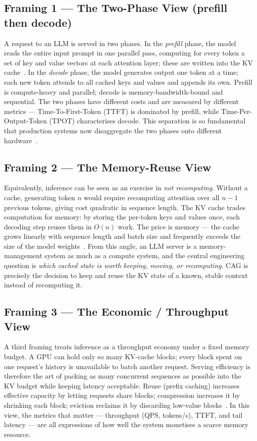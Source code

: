 \documentclass[12pt,a4paper]{article}
\let\cite\citep
\begin{document}
\subsection{Framing 1 --- The Two-Phase View (prefill then decode)}

A request to an LLM is served in two phases. In the \emph{prefill} phase, the
model reads the entire input prompt in one parallel pass, computing for every
token a set of key and value vectors at each attention layer; these are written
into the KV cache~\cite{vaswani2017attention, kwon2023efficient}. In the
\emph{decode} phase, the model generates output one token at a time; each new
token attends to all cached keys and values and appends its own. Prefill is
compute-heavy and parallel; decode is memory-bandwidth-bound and sequential. The
two phases have different costs and are measured by different metrics ---
Time-To-First-Token (TTFT) is dominated by prefill, while Time-Per-Output-Token
(TPOT) characterises decode. This separation is so fundamental that production
systems now disaggregate the two phases onto different
hardware~\cite{zhong2024distserve}.

\subsection{Framing 2 --- The Memory-Reuse View}

Equivalently, inference can be seen as an exercise in \emph{not recomputing}.
Without a cache, generating token $n$ would require recomputing attention over all
$n-1$ previous tokens, giving cost quadratic in sequence length. The KV cache
trades computation for memory: by storing the per-token keys and values once, each
decoding step reuses them in $O(n)$ work. The price is memory --- the cache grows
linearly with sequence length and batch size and frequently exceeds the size of
the model weights~\cite{li2024kvsurvey}. From this angle, an LLM server is a
memory-management system as much as a compute system, and the central engineering
question is \emph{which cached state is worth keeping, moving, or
recomputing}. CAG is precisely the decision to keep and reuse the KV state of a
known, stable context instead of recomputing it.

\subsection{Framing 3 --- The Economic / Throughput View}

A third framing treats inference as a throughput economy under a fixed memory
budget. A GPU can hold only so many KV-cache blocks; every block spent on one
request's history is unavailable to batch another request. Serving efficiency is
therefore the art of packing as many concurrent sequences as possible into the KV
budget while keeping latency acceptable. Reuse (prefix caching) increases
effective capacity by letting requests share blocks; compression increases it by
shrinking each block; eviction reclaims it by discarding low-value
blocks~\cite{kvcompresssurvey}. In this view, the metrics that matter ---
throughput (QPS, tokens/s), TTFT, and tail latency --- are all expressions of how
well the system monetises a scarce memory resource.
\end{document}
